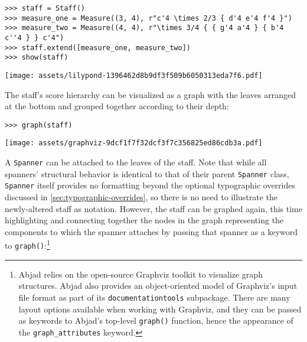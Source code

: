 \begin{abjadbookoutput}
\begin{singlespacing}
\vspace{-0.5\baselineskip}
\begin{lstlisting}
>>> staff = Staff()
>>> measure_one = Measure((3, 4), r"c'4 \times 2/3 { d'4 e'4 f'4 }")
>>> measure_two = Measure((4, 4), r"\times 3/4 { { g'4 a'4 } { b'4 c''4 } } c'4")
>>> staff.extend([measure_one, measure_two])
>>> show(staff)
\end{lstlisting}
\noindent\texttt{[image: assets/lilypond-1396462d8b9df3f509b6050313eda7f6.pdf]}
\end{singlespacing}
\end{abjadbookoutput}

\noindent The staff's score hierarchy can be visualized as a graph with the
leaves arranged at the bottom and grouped together according to their depth:

\begin{comment}
<abjad>
graph(staff)
</abjad>
\end{comment}

\begin{abjadbookoutput}
\begin{singlespacing}
\vspace{-0.5\baselineskip}
\begin{lstlisting}
>>> graph(staff)
\end{lstlisting}
\noindent\texttt{[image: assets/graphviz-9dcf1f7f32dcf3f7c356825ed86cdb3a.pdf]}
\end{singlespacing}
\end{abjadbookoutput}

\noindent A \texttt{Spanner} can be attached to the leaves of the staff. Note
that while all spanners' structural behavior is identical to that of their
parent \texttt{Spanner} class, \texttt{Spanner} itself provides no formatting
beyond the optional typographic overrides discussed in
\autoref{sec:typographic-overrides}, so there is no need to illustrate the
newly-altered staff as notation. However, the staff can be graphed again, this
time highlighting and connecting together the nodes in the graph representing
the components to which the spanner attaches by passing that spanner as a
keyword to \texttt{graph()}:\footnote{Abjad relies on the open-source Graphviz
toolkit to visualize graph structures. Abjad also provides an object-oriented
model of Graphviz's input file format as part of its
\texttt{documentationtools} subpackage. There are many layout options available
when working with Graphviz, and they can be passed as keywords to Abjad's
top-level \texttt{graph()} function, hence the appearance of the
\texttt{graph\_attributes} keyword.}

